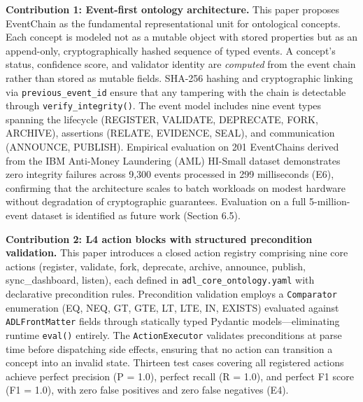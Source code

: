\textbf{Contribution 1: Event-first ontology architecture.} This paper proposes EventChain as the fundamental representational unit for ontological concepts. Each concept is modeled not as a mutable object with stored properties but as an append-only, cryptographically hashed sequence of typed events. A concept's status, confidence score, and validator identity are \emph{computed} from the event chain rather than stored as mutable fields. SHA-256 hashing and cryptographic linking via \texttt{previous\_event\_id} ensure that any tampering with the chain is detectable through \texttt{verify\_integrity()}. The event model includes nine event types spanning the lifecycle (REGISTER, VALIDATE, DEPRECATE, FORK, ARCHIVE), assertions (RELATE, EVIDENCE, SEAL), and communication (ANNOUNCE, PUBLISH). Empirical evaluation on 201 EventChains derived from the IBM Anti-Money Laundering (AML) HI-Small dataset demonstrates zero integrity failures across 9,300 events processed in 299 milliseconds (E6), confirming that the architecture scales to batch workloads on modest hardware without degradation of cryptographic guarantees. Evaluation on a full 5-million-event dataset is identified as future work (Section 6.5).

\textbf{Contribution 2: L4 action blocks with structured precondition validation.} This paper introduces a closed action registry comprising nine core actions (register, validate, fork, deprecate, archive, announce, publish, sync\_dashboard, listen), each defined in \texttt{adl\_core\_ontology.yaml} with declarative precondition rules. Precondition validation employs a \texttt{Comparator} enumeration (EQ, NEQ, GT, GTE, LT, LTE, IN, EXISTS) evaluated against \texttt{ADLFrontMatter} fields through statically typed Pydantic models---eliminating runtime \texttt{eval()} entirely. The \texttt{ActionExecutor} validates preconditions at parse time before dispatching side effects, ensuring that no action can transition a concept into an invalid state. Thirteen test cases covering all registered actions achieve perfect precision (P = 1.0), perfect recall (R = 1.0), and perfect F1 score (F1 = 1.0), with zero false positives and zero false negatives (E4).

